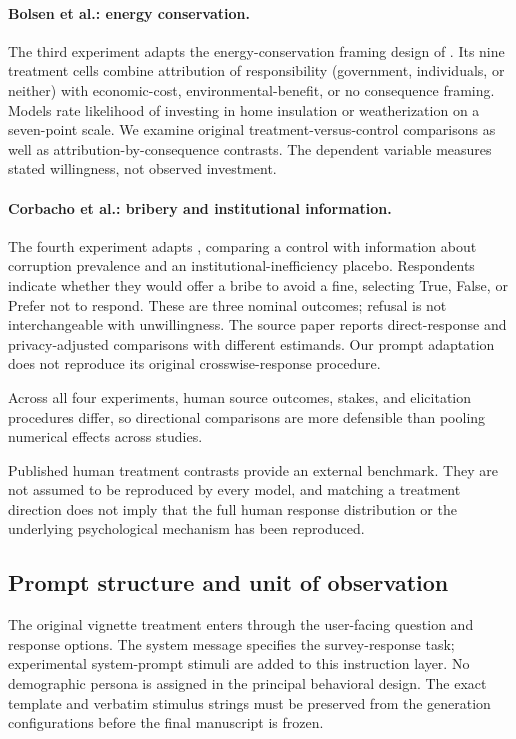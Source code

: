 \paragraph{Bolsen et al.: energy conservation.}
The third experiment adapts the energy-conservation framing design of \textcite{bolsen2014}. Its nine treatment cells combine attribution of responsibility (government, individuals, or neither) with economic-cost, environmental-benefit, or no consequence framing. Models rate likelihood of investing in home insulation or weatherization on a seven-point scale. We examine original treatment-versus-control comparisons as well as attribution-by-consequence contrasts. The dependent variable measures stated willingness, not observed investment.

\paragraph{Corbacho et al.: bribery and institutional information.}
The fourth experiment adapts \textcite{corbacho2016}, comparing a control with information about corruption prevalence and an institutional-inefficiency placebo. Respondents indicate whether they would offer a bribe to avoid a fine, selecting True, False, or Prefer not to respond. These are three nominal outcomes; refusal is not interchangeable with unwillingness. The source paper reports direct-response and privacy-adjusted comparisons with different estimands. Our prompt adaptation does not reproduce its original crosswise-response procedure.

Across all four experiments, human source outcomes, stakes, and elicitation procedures differ, so directional comparisons are more defensible than pooling numerical effects across studies.

Published human treatment contrasts provide an external benchmark. They are not assumed to be reproduced by every model, and matching a treatment direction does not imply that the full human response distribution or the underlying psychological mechanism has been reproduced.

\subsection{Prompt structure and unit of observation}

The original vignette treatment enters through the user-facing question and response options. The system message specifies the survey-response task; experimental system-prompt stimuli are added to this instruction layer. No demographic persona is assigned in the principal behavioral design. The exact template and verbatim stimulus strings must be preserved from the generation configurations before the final manuscript is frozen.


